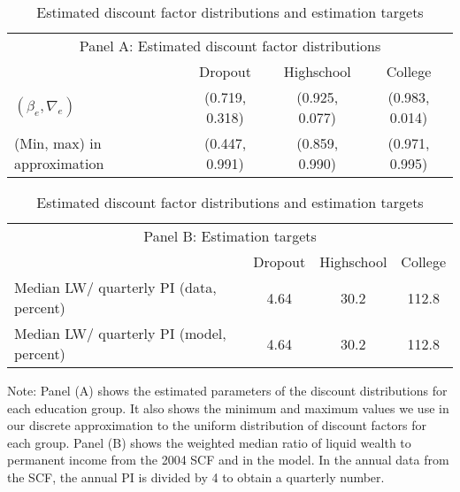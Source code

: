 \documentclass[\PathToRoot/\ProjectName]{subfiles}
\begin{document}
\begin{table}[tb] 
  \caption{Estimated discount factor distributions and estimation targets}
  \whenintegrated{\label{tab:estimBetas}} 
  \centering

  \begin{tabular*}
    {\textwidth}{@{\extracolsep{\fill}}lccc@{}}
    \multicolumn{4}{c}{\small Panel A: Estimated discount factor distributions} \\
    \addlinespace
    \hline
    & Dropout & Highschool & College \\ \hline
    $(\beta_e, \nabla_e)$ & (0.719, 0.318) & (0.925, 0.077) & (0.983, 0.014) \\
    (Min, max) in approximation & (0.447, 0.991) & (0.859, 0.990) & (0.971, 0.995) \\
    \hline
  \end{tabular*}

  \vspace{0.5em}

  \begin{tabular*}
    {\textwidth}{@{\extracolsep{\fill}}lccc@{}}
    \multicolumn{4}{c}{\small Panel B: Estimation targets} \\
    \addlinespace
    \hline
    & Dropout & Highschool & College \\ \hline
    Median LW/ quarterly PI (data, percent) & 4.64 & 30.2 & 112.8 \\
    Median LW/ quarterly PI (model, percent) & 4.64 & 30.2 & 112.8 \\
    \hline
  \end{tabular*}

  \noindent\parbox{\textwidth}{
    \medskip
    \footnotesize Note: Panel (A) shows the estimated parameters of the discount distributions for each education group. It also shows the minimum and maximum values we use in our discrete approximation to the uniform distribution of discount factors for each group. Panel (B) shows the weighted median ratio of liquid wealth to permanent income from the 2004 SCF and in the model. In the annual data from the SCF, the annual PI is divided by 4 to obtain a quarterly number.
  }

\end{table}

\smartbib
\end{document}
